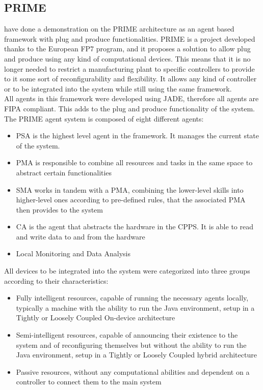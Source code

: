 \subsection{PRIME}

\citeauthor{PRIME_plug_and_produce} \cite{PRIME_plug_and_produce} have done a demonstration on the PRIME architecture as an agent based framework with plug and produce functionalities. PRIME is a project developed thanks to the European FP7 program, and it proposes a solution to allow plug and produce using any kind of computational devices. This means that it is no longer needed to restrict a manufacturing plant to specific controllers to provide to it some sort of reconfigurability and flexibility. It allows any kind of controller or to be integrated into the system while still using the same framework.\\

All agents in this framework were developed using \acrshort{JADE}, therefore all agents are \acrshort{FIPA} compliant. This adds to the plug and produce functionality of the system. The PRIME agent system is composed of eight different agents:
\begin{itemize}
	\item \acrfull{PSA} is the highest level agent in the framework. It manages the current state of the system.
	\item \acrfull{PMA} is responsible to combine all resources and tasks in the same space to abstract certain functionalities
	\item \acrfull{SMA} works in tandem with a \acrshort{PMA}, combining the lower-level skills into higher-level ones according to pre-defined rules, that the associated \acrshort{PMA} then provides to the system
	\item \acrfull{CA} is the agent that abstracts the hardware in the \acrshort{CPPS}. It is able to read and write data to and from the hardware
	\item Local Monitoring and Data Analysis
\end{itemize}

All devices to be integrated into the system were categorized into three groups according to their characteristics:
\begin{itemize}
	\item Fully intelligent resources, capable of running the necessary agents locally, typically a machine with the ability to run the Java environment, setup in a Tightly or Loosely Coupled On-device architecture
	\item Semi-intelligent resources, capable of announcing their existence to the system and of reconfiguring themselves but without the ability to run the Java environment, setup in a Tightly or Loosely Coupled hybrid architecture
	\item Passive resources, without any computational abilities and dependent on a controller to connect them to the main system  
\end{itemize}


